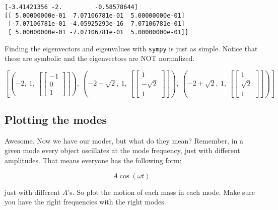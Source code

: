 \begin{verbatim}
[-3.41421356 -2.         -0.58578644]
[[ 5.00000000e-01  7.07106781e-01  5.00000000e-01]
 [-7.07106781e-01 -4.05925293e-16  7.07106781e-01]
 [ 5.00000000e-01 -7.07106781e-01  5.00000000e-01]]
\end{verbatim}

Finding the eigenvectors and eigenvalues with \texttt{sympy} is just as
simple. Notice that these are symbolic and the eigenvectors are NOT
normalized.

\begin{Shaded}
\begin{Highlighting}[]
\end{Highlighting}
\end{Shaded}

\(\displaystyle \left[ \left( -2, \  1, \  \left[ \left[\begin{matrix}-1\\0\\1\end{matrix}\right]\right]\right), \  \left( -2 - \sqrt{2}, \  1, \  \left[ \left[\begin{matrix}1\\- \sqrt{2}\\1\end{matrix}\right]\right]\right), \  \left( -2 + \sqrt{2}, \  1, \  \left[ \left[\begin{matrix}1\\\sqrt{2}\\1\end{matrix}\right]\right]\right)\right]\)

\subsection{Plotting the modes}\label{plotting-the-modes}

Awesome. Now we have our modes, but what do they mean? Remember, in a
given mode every object oscillates at the mode frequency, just with
different amplitudes. That means everyone has the following form:

\[A\cos(\omega t)\]

just with different \(A\)'s. So plot the motion of each mass in each
mode. Make sure you have the right frequencies with the right modes.

\begin{Shaded}
\begin{Highlighting}[]
\end{Highlighting}
\end{Shaded}

